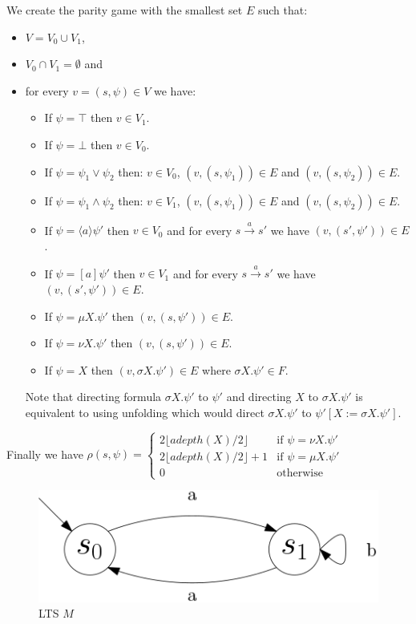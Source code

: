 \begin{definition}
	We create the parity game with the smallest set $E$ such that:
	\begin{itemize}
		\item $V = V_0 \cup V_1$,
		\item $V_0 \cap V_1 = \emptyset$ and
		\item for every $v = (s, \psi) \in V$ we have:
		\begin{itemize}
			\item If $\psi = \top$ then $v \in V_1$.
			\item If $\psi = \bot$ then $v \in V_0$.
			\item If $\psi = \psi_1 \vee \psi_2$ then:
			\subitem $v \in V_0$,
			\subitem $(v, (s,\psi_1)) \in E$ and
			\subitem $(v, (s,\psi_2)) \in E$.
			\item If $\psi = \psi_1 \wedge \psi_2$ then:
			\subitem $v \in V_1$,
			\subitem $(v, (s,\psi_1)) \in E$ and
			\subitem $(v, (s,\psi_2)) \in E$.
			\item If $\psi = \langle a \rangle \psi'$ then $v \in V_0$ and for every $s \xrightarrow{ a} s'$ we have $(v, (s', \psi')) \in E$.
			\item If $\psi = [ a ] \psi'$ then $v \in V_1$ and for every $s \xrightarrow{ a} s'$ we have  $(v, (s', \psi')) \in E$.
			\item If $\psi = \mu X. \psi'$ then $(v, (s, \psi')) \in E$.
			\item If $\psi = \nu X. \psi'$ then $(v, (s, \psi')) \in E$.
			\item If $\psi = X$ then $(v, \sigma X. \psi') \in E$ where $\sigma X. \psi' \in F$.
		\end{itemize}
		Note that directing formula $\sigma X. \psi'$ to $\psi'$ and directing $X$ to $\sigma X. \psi'$ is equivalent to using unfolding which would direct $\sigma X. \psi'$ to $\psi'[X:=\sigma X. \psi']$.
	\end{itemize}
	
	
	Finally we have $\rho(s, \psi) = \begin{cases}
	2 \lfloor adepth(X) / 2 \rfloor & \text{if } \psi = \nu X. \psi'\\
	2 \lfloor adepth(X) / 2 \rfloor + 1 & \text{if } \psi = \mu X. \psi'\\
	0 & \text{otherwise}
	\end{cases}$
\end{definition}
\begin{figure}[h]
	\centering
	\includegraphics[scale=0.3]{Examples/ExamleVerification/LTSprojempty}
	\caption[LTS $M$]{LTS $M$}
	\label{fig:exverltsprojempty}
\end{figure}
